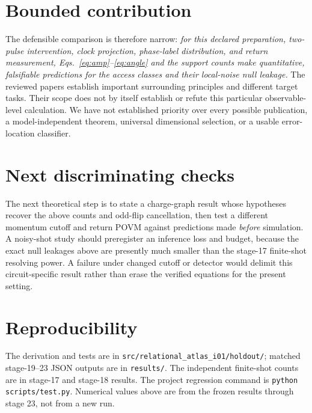 \documentclass[11pt,a4paper]{article}
\begin{document}
\newpage
\section*{Bounded contribution}
The defensible comparison is therefore narrow: \emph{for this declared preparation, two-pulse intervention, clock projection, phase-label distribution, and return measurement, Eqs.~\eqref{eq:amp}--\eqref{eq:angle} and the support counts make quantitative, falsifiable predictions for the access classes and their local-noise null leakage.} The reviewed papers establish important surrounding principles and different target tasks. Their scope does not by itself establish or refute this particular observable-level calculation. We have not established priority over every possible publication, a model-independent theorem, universal dimensional selection, or a usable error-location classifier.

\section*{Next discriminating checks}
The next theoretical step is to state a charge-graph result whose hypotheses recover the above counts and odd-flip cancellation, then test a different momentum cutoff and return POVM against predictions made \emph{before} simulation. A noisy-shot study should preregister an inference loss and budget, because the exact null leakages above are presently much smaller than the stage-17 finite-shot resolving power. A failure under changed cutoff or detector would delimit this circuit-specific result rather than erase the verified equations for the present setting.

\section*{Reproducibility}
The derivation and tests are in \texttt{src/relational\_atlas\_i01/holdout/}; matched stage-19--23 JSON outputs are in \texttt{results/}. The independent finite-shot counts are in stage-17 and stage-18 results. The project regression command is \texttt{python scripts/test.py}. Numerical values above are from the frozen results through stage 23, not from a new run.
\end{document}
